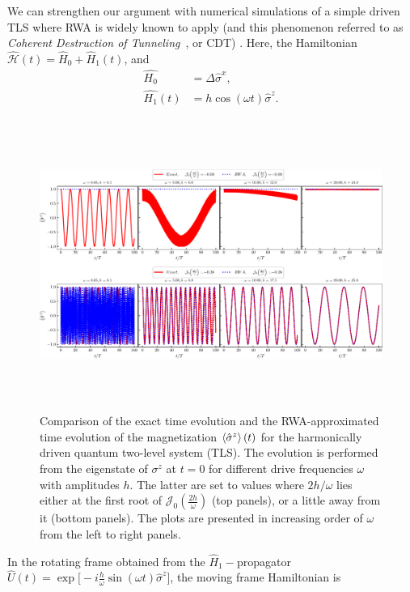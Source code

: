 \documentclass[aps,prb,reprint,showpacs,floatfix,superscriptaddress, onecolumn, nofootinbib, 9pt]{revtex4-2}
\newcommand{\ar}[1]{{\color{blue}#1}} %
\begin{document}
\begin{enumerate}
{     We can strengthen our argument with numerical simulations of a simple driven TLS  where RWA is widely known to apply (and this phenomenon referred to as \textit{Coherent Destruction of Tunneling}~\cite{Grossmann1991, Ashhab2007}, or CDT) . Here, the Hamiltonian $\hat{\mathcal{H}}(t) = \hat{H}_0 + \hat{H}_1(t)$, and  
    \begin{align}
    \hat{H_0} &= \Delta \hat{\sigma}^x,\nonumber \\
    \hat{H_1}(t) &= h \cos(\omega t)\hat{\sigma}^z.
    \end{align}}
 \begin{figure}[t!]
	\begin{center}
		\includegraphics[height=9.5cm]{rwa_vs_exact_w_low_n_high_frz_nfrz.pdf}
	\end{center}
	\caption[] {Comparison of the exact time evolution and the RWA-approximated time evolution of the magnetization $\expval{\hat{\sigma}^z}(t)$ for the harmonically driven quantum two-level system (TLS). The evolution is performed from the eigenstate of $\sigma^z$ at $t=0$ for different drive frequencies $\omega$ with amplitudes $h$. The latter are set to values where $2h/\omega$ lies either at the first root of $\mathcal{J}_0\left(\frac{2h}{\omega}\right)$ (top panels), or a little away from it (bottom panels). The plots are presented in increasing order of $\omega$ from the left to right panels.}
	\label{Fig:compare_exact_rwa}
\end{figure}
    \ar{In the rotating frame obtained from the $\hat{H}_1-$propagator $\hat{U}(t) = \exp\big[-i \frac{h}{\omega} \sin(\omega t)\hat{\sigma}^z\big]$, the moving frame Hamiltonian is
    \begin{align}

\end{align}}
\end{enumerate}
\end{document}
